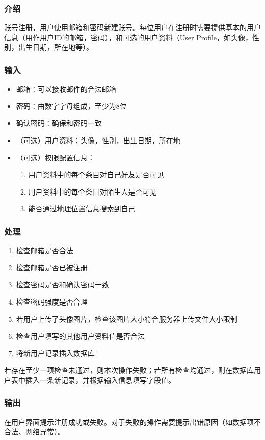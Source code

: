 \subsubsection{介绍}

账号注册，用户使用邮箱和密码新建账号。每位用户在注册时需要提供基本的用户信息（用作用户ID的邮箱，密码），和可选的用户资料（User Profile，如头像，性别，出生日期，所在地等）。

\subsubsection{输入}
\begin{itemize}
	\item 邮箱：可以接收邮件的合法邮箱
	\item 密码：由数字字母组成，至少为8位
	\item 确认密码：确保和密码一致
	\item （可选）用户资料：头像，性别，出生日期，所在地
	\item （可选）权限配置信息：
		\begin{enumerate}	
		\item 用户资料中的每个条目对自己好友是否可见
		\item 用户资料中的每个条目对陌生人是否可见
		\item 能否通过地理位置信息搜索到自己
		\end{enumerate}
	\end{itemize}

\subsubsection{处理}
\begin{enumerate}
	\item 检查邮箱是否合法
	\item 检查邮箱是否已被注册
	\item 检查密码是否和确认密码一致
	\item 检查密码强度是否合理
	\item 若用户上传了头像图片，检查该图片大小符合服务器上传文件大小限制
	\item 检查用户填写的其他用户资料值是否合法
	\item 将新用户记录插入数据库
	\end{enumerate}
若存在至少一项检查未通过，则本次操作失败；若所有检查均通过，则在数据库用户表中插入一条新记录，并根据输入信息填写字段值。

\subsubsection{输出}
在用户界面提示注册成功或失败。对于失败的操作需要提示出错原因（如数据项不合法、网络异常）。


